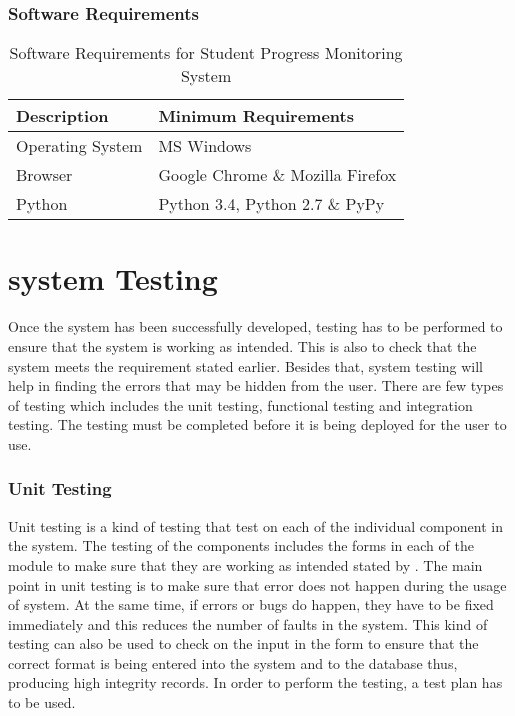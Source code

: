 \documentclass{article}
\begin{document}
\subsubsection{Software Requirements}
\begin{table}[h!]
\centering
\begin{tabular} {  | m{8cm} | m{6cm}| }
 \hline
 \textbf{Description} &  \textbf{Minimum Requirements}\\
 \hline
Operating System & MS Windows \\
\hline
 Browser &  Google Chrome \& Mozilla Firefox \\
\hline
Python & Python 3.4, Python 2.7 \& PyPy \\
\hline
\end{tabular}
\caption{Software Requirements for Student Progress Monitoring System}
\label{table:3}
\end{table}
\vspace{3mm}
\section{system Testing}
	\par Once the system has been successfully developed, testing has to be performed to ensure that the system is working as intended. This is also to check that the system meets the requirement stated earlier. Besides that, system testing will help in finding the errors that may be hidden from the user. There are few types of testing which includes the unit testing, functional testing and integration testing. The testing must be completed before it is being deployed for the user to use.\cite{simleyteaching}
\subsubsection{Unit Testing}
\par Unit testing is a kind of testing that test on each of the individual component in the system. The testing of the components includes the forms in each of the module to make sure that they are working as intended stated by \cite{win}. The main point in unit testing is to make sure that error does not happen during the usage of system. At the same time, if errors or bugs do happen, they have to be fixed immediately and this reduces the number of faults in the system. This kind of testing can also be used to check on the input in the form to ensure that the correct format is being entered into the system and to the database thus, producing high integrity records. In order to perform the testing, a test plan has to be used.
\end{document}
